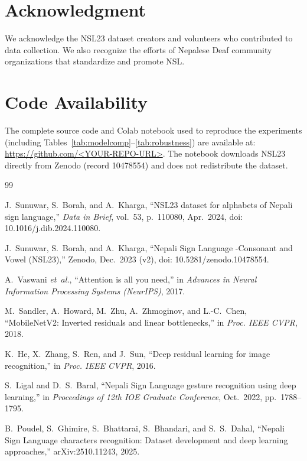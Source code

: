 \documentclass[conference]{IEEEtran}
\begin{document}
\section*{Acknowledgment}
We acknowledge the NSL23 dataset creators and volunteers who contributed to data collection. We also recognize the efforts of Nepalese Deaf community organizations that standardize and promote NSL.

\appendices
\section{Code Availability}
\label{app:code}
The complete source code and Colab notebook used to reproduce the experiments (including Tables~\ref{tab:modelcomp}--\ref{tab:robustness}) are available at:
\url{https://github.com/<YOUR-REPO-URL>}.
The notebook downloads NSL23 directly from Zenodo (record 10478554) and does not redistribute the dataset.

\begin{thebibliography}{99}

J.~Sunuwar, S.~Borah, and A.~Kharga, ``NSL23 dataset for alphabets of Nepali sign language,'' \emph{Data in Brief}, vol.~53, p.~110080, Apr.~2024, doi: 10.1016/j.dib.2024.110080.

J.~Sunuwar, S.~Borah, and A.~Kharga, ``Nepali Sign Language -Consonant and Vowel (NSL23),'' Zenodo, Dec.~2023 (v2), doi: 10.5281/zenodo.10478554.

A.~Vaswani \emph{et~al.}, ``Attention is all you need,'' in \emph{Advances in Neural Information Processing Systems (NeurIPS)}, 2017.

M.~Sandler, A.~Howard, M.~Zhu, A.~Zhmoginov, and L.-C.~Chen, ``MobileNetV2: Inverted residuals and linear bottlenecks,'' in \emph{Proc. IEEE CVPR}, 2018.

K.~He, X.~Zhang, S.~Ren, and J.~Sun, ``Deep residual learning for image recognition,'' in \emph{Proc. IEEE CVPR}, 2016.

S.~Ligal and D.~S.~Baral, ``Nepali Sign Language gesture recognition using deep learning,'' in \emph{Proceedings of 12th IOE Graduate Conference}, Oct.~2022, pp.~1788--1795.

B.~Poudel, S.~Ghimire, S.~Bhattarai, S.~Bhandari, and S.~S.~Dahal, ``Nepali Sign Language characters recognition: Dataset development and deep learning approaches,'' arXiv:2510.11243, 2025.

\end{thebibliography}
\end{document}
